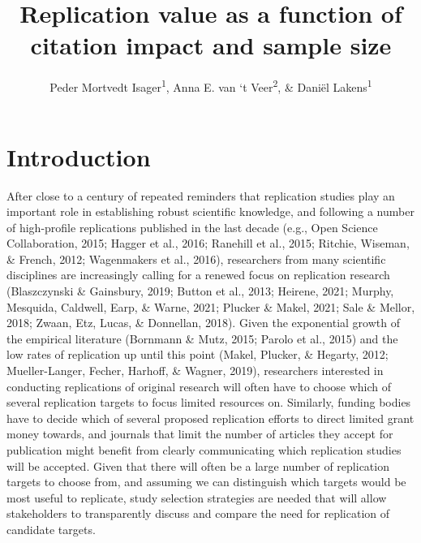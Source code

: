 \documentclass[
  english,
  jou,floatsintext]{apa6}
\title{Replication value as a function of citation impact and sample size}
\author{Peder Mortvedt Isager\textsuperscript{1}, Anna E. van `t Veer\textsuperscript{2}, \& Daniël Lakens\textsuperscript{1}}
\date{}
\affiliation{\vspace{0.5cm}\textsuperscript{1} Department of Industrial Engineering \& Innovation Sciences, Eindhoven University of Technology\\\textsuperscript{2} Methodology and Statistics unit, Institute of Psychology, Leiden University}
\begin{document}
\maketitle

\hypertarget{introduction}{%
\section{Introduction}\label{introduction}}

After close to a century of repeated reminders that replication studies play an important role in establishing robust scientific knowledge, and following a number of high-profile replications published in the last decade (e.g., Open Science Collaboration, 2015; Hagger et al., 2016; Ranehill et al., 2015; Ritchie, Wiseman, \& French, 2012; Wagenmakers et al., 2016), researchers from many scientific disciplines are increasingly calling for a renewed focus on replication research (Blaszczynski \& Gainsbury, 2019; Button et al., 2013; Heirene, 2021; Murphy, Mesquida, Caldwell, Earp, \& Warne, 2021; Plucker \& Makel, 2021; Sale \& Mellor, 2018; Zwaan, Etz, Lucas, \& Donnellan, 2018). Given the exponential growth of the empirical literature (Bornmann \& Mutz, 2015; Parolo et al., 2015) and the low rates of replication up until this point (Makel, Plucker, \& Hegarty, 2012; Mueller-Langer, Fecher, Harhoff, \& Wagner, 2019), researchers interested in conducting replications of original research will often have to choose which of several replication targets to focus limited resources on. Similarly, funding bodies have to decide which of several proposed replication efforts to direct limited grant money towards, and journals that limit the number of articles they accept for publication might benefit from clearly communicating which replication studies will be accepted. Given that there will often be a large number of replication targets to choose from, and assuming we can distinguish which targets would be most useful to replicate, study selection strategies are needed that will allow stakeholders to transparently discuss and compare the need for replication of candidate targets.
\end{document}
